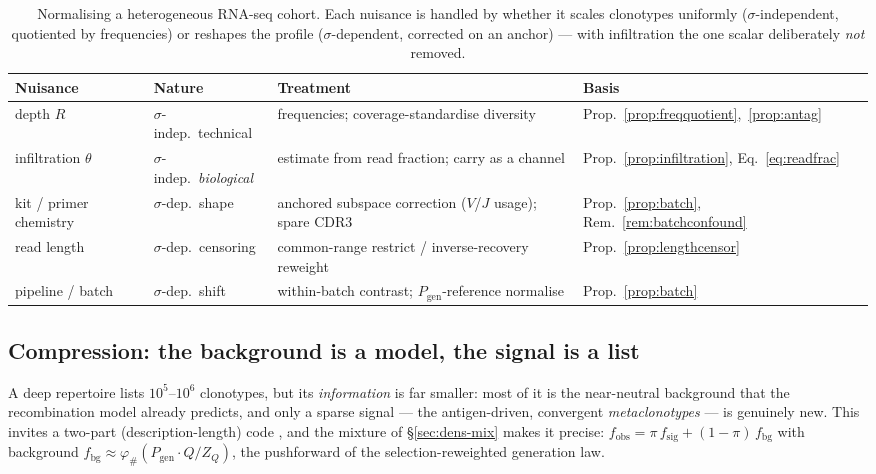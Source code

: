 \documentclass[11pt]{article}
\theoremstyle{oldplain}
\theoremstyle{oldrem}
\newcommand{\Pgen}{P_{\mathrm{gen}}}
\begin{document}
\begin{table}[h]
  \centering
  \caption{Normalising a heterogeneous {\scshape RNA}-seq cohort. Each nuisance is handled by whether it scales
  clonotypes uniformly ($\sigma$-independent, quotiented by frequencies) or reshapes the profile
  ($\sigma$-dependent, corrected on an anchor) --- with infiltration the one scalar deliberately \emph{not}
  removed.}
  \label{tab:norm}
  \begin{tabular}{@{}llp{4.5cm}l@{}}
    \toprule
    Nuisance & Nature & Treatment & Basis \\
    \midrule
    depth $R$ & $\sigma$-indep.\ technical & frequencies; coverage-standardise diversity &
      Prop.~\ref{prop:freqquotient},~\ref{prop:antag} \\
    infiltration $\theta$ & $\sigma$-indep.\ \emph{biological} & estimate from read fraction; carry as a
      channel & Prop.~\ref{prop:infiltration}, Eq.~\eqref{eq:readfrac} \\
    kit / primer chemistry & $\sigma$-dep.\ shape & anchored subspace correction ($V$/$J$ usage); spare
      {\scshape CDR3} & Prop.~\ref{prop:batch}, Rem.~\ref{rem:batchconfound} \\
    read length & $\sigma$-dep.\ censoring & common-range restrict / inverse-recovery reweight &
      Prop.~\ref{prop:lengthcensor} \\
    pipeline / batch & $\sigma$-dep.\ shift & within-batch contrast; $\Pgen$-reference normalise &
      Prop.~\ref{prop:batch} \\
    \bottomrule
  \end{tabular}
\end{table}

\subsection{Compression: the background is a model, the signal is a list}\label{sec:samp-compress}

A deep repertoire lists $10^5$--$10^6$ clonotypes, but its \emph{information} is far smaller: most of it is the
near-neutral background that the recombination model already predicts, and only a sparse signal --- the
antigen-driven, convergent \emph{metaclonotypes} --- is genuinely new. This invites a two-part
(description-length) code \cite{CoverThomas2006}, and the mixture of \S\ref{sec:dens-mix} makes it precise:
$f_{\mathrm{obs}}=\pi\,f_{\mathrm{sig}}+(1-\pi)\,f_{\mathrm{bg}}$ with background
$f_{\mathrm{bg}}\approx\varphi_{\#}(\Pgen\!\cdot\!Q/Z_Q)$, the pushforward of the selection-reweighted
generation law.
\end{document}
